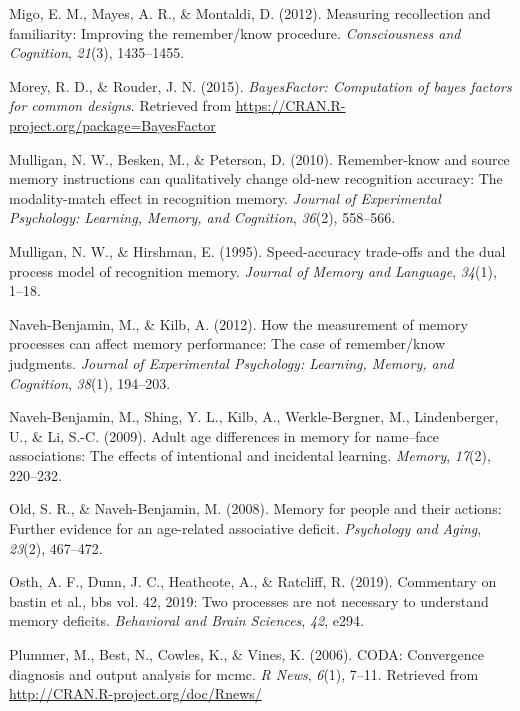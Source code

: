 \documentclass[english,,man,floatsintext]{apa6}
\begin{document}
\leavevmode\hypertarget{ref-Migo:etal:2012}{}%
Migo, E. M., Mayes, A. R., \& Montaldi, D. (2012). Measuring recollection and familiarity: Improving the remember/know procedure. \emph{Consciousness and Cognition}, \emph{21}(3), 1435--1455.

\leavevmode\hypertarget{ref-R-BayesFactor}{}%
Morey, R. D., \& Rouder, J. N. (2015). \emph{BayesFactor: Computation of bayes factors for common designs}. Retrieved from \url{https://CRAN.R-project.org/package=BayesFactor}

\leavevmode\hypertarget{ref-Mulligan:etal:2010}{}%
Mulligan, N. W., Besken, M., \& Peterson, D. (2010). Remember-know and source memory instructions can qualitatively change old-new recognition accuracy: The modality-match effect in recognition memory. \emph{Journal of Experimental Psychology: Learning, Memory, and Cognition}, \emph{36}(2), 558--566.

\leavevmode\hypertarget{ref-Mulligan:Hirshman:1995}{}%
Mulligan, N. W., \& Hirshman, E. (1995). Speed-accuracy trade-offs and the dual process model of recognition memory. \emph{Journal of Memory and Language}, \emph{34}(1), 1--18.

\leavevmode\hypertarget{ref-naveh2012}{}%
Naveh-Benjamin, M., \& Kilb, A. (2012). How the measurement of memory processes can affect memory performance: The case of remember/know judgments. \emph{Journal of Experimental Psychology: Learning, Memory, and Cognition}, \emph{38}(1), 194--203.

\leavevmode\hypertarget{ref-naveh2009}{}%
Naveh-Benjamin, M., Shing, Y. L., Kilb, A., Werkle-Bergner, M., Lindenberger, U., \& Li, S.-C. (2009). Adult age differences in memory for name--face associations: The effects of intentional and incidental learning. \emph{Memory}, \emph{17}(2), 220--232.

\leavevmode\hypertarget{ref-Old2008}{}%
Old, S. R., \& Naveh-Benjamin, M. (2008). Memory for people and their actions: Further evidence for an age-related associative deficit. \emph{Psychology and Aging}, \emph{23}(2), 467--472.

\leavevmode\hypertarget{ref-Osth:etal:2019}{}%
Osth, A. F., Dunn, J. C., Heathcote, A., \& Ratcliff, R. (2019). Commentary on bastin et al., bbs vol. 42, 2019: Two processes are not necessary to understand memory deficits. \emph{Behavioral and Brain Sciences}, \emph{42}, e294.

\leavevmode\hypertarget{ref-R-coda}{}%
Plummer, M., Best, N., Cowles, K., \& Vines, K. (2006). CODA: Convergence diagnosis and output analysis for mcmc. \emph{R News}, \emph{6}(1), 7--11. Retrieved from \url{http://CRAN.R-project.org/doc/Rnews/}
\end{document}
